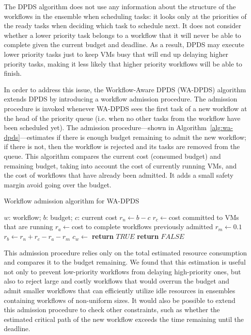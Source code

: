\documentclass{sig-alternate}
\begin{document}
The DPDS algorithm does not use any information about the structure of the workflows
in the ensemble when scheduling tasks: it looks only at the priorities of the ready 
tasks when deciding which task to schedule next. It does not consider whether a lower 
priority task belongs to a workflow that it will never be able to complete given the 
current budget and deadline. As a result, DPDS may execute lower priority tasks just 
to keep VMs busy that will end up delaying higher priority tasks, making it less likely
that higher priority workflows will be able to finish.

In order to address this issue, the Workflow-Aware DPDS (WA-DPDS) algorithm extends 
DPDS by introducing a workflow admission procedure. The admission procedure is
invoked whenever WA-DPDS sees the first task of a new workflow at the head of the 
priority queue (i.e. when no other tasks from the workflow have been scheduled yet). 
The admission procedure---shown in Algorithm~\ref{alg:wa-dpds}---estimates if there is 
enough budget remaining to admit the new workflow; if there is not, then the 
workflow is rejected and its tasks are removed from the queue. This algorithm 
compares the current cost (consumed budget) and remaining budget, taking
into account the cost of currently running VMs, and the cost of workflows 
that have already been admitted. It adds a small safety margin avoid going over
the budget.

\begin{algorithm}
\caption{Workflow admission algorithm for WA-DPDS}
\label{alg:wa-dpds}
\begin{algorithmic}[1]
\Require $w$: workflow; $b$: budget; $c$: current cost
    \State $r_n\gets b-c$ 
    \State $r_c\gets $cost committed to VMs that are running
    \State $r_a\gets $cost to complete workflows previously admitted
	\State $r_m\gets 0.1$ 
	\State $r_b\gets r_n+r_c-r_a-r_m$ 
	\State $c_w\gets$ 
    	\State \textbf{return} $TRUE$
    \Else
    	\State \textbf{return} $FALSE$
	\EndIf    	 
\EndProcedure
\end{algorithmic} 
\end{algorithm}


This admission procedure relies only on the total estimated resource consumption and
compares it to the budget remaining. We found that this estimation is useful not
only to prevent low-priority workflows from delaying high-priority ones, but
also to reject large and costly workflows that would overrun the budget and
admit smaller workflows that can efficiently utilize idle resources in ensembles 
containing workflows of non-uniform sizes. It would also be possible to extend this 
admission procedure to check other constraints, such as whether the estimated 
critical path of the new workflow exceeds the time remaining until the deadline.
\end{document}
